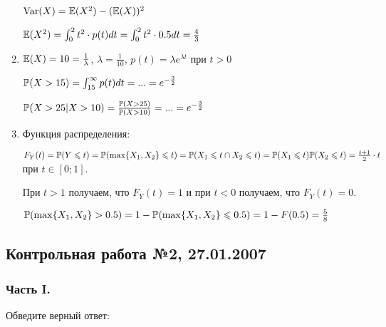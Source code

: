 \begin{enumerate}
$\Var(X)=\E(X^{2})-(\E(X))^{2}$

$\E(X^{2})=\int_{0}^{2}t^{2}\cdot p(t)dt=\int_{0}^{2}t^{2}\cdot 0.5dt=\frac{4}{3}$
\item $\E(X)=10=\frac{1}{\lambda}$, $\lambda=\frac{1}{10}$, $p(t)=\lambda e^{\lambda t}$ при $t>0$

$\P(X>15)=\int_{15}^{\infty}p(t)dt=...=e^{-\frac{3}{2}}$

$\P(X>25|X>10)=\frac{\P(X>25)}{\P(X>10)}=...=e^{-\frac{3}{2}}$
\item Функция распределения:

$F_{Y}(t)=\P(Y\le t)=\P(\max\{X_{1},X_{2}\}\le t)=\P(X_{1}\le t\cap X_{2}\le t)=\P(X_{1}\le t)\P(X_{2}\le t)=\frac{t+1}{2}\cdot t$ при $t\in [0;1]$.

При $t>1$ получаем, что $F_{Y}(t)=1$ и при $t<0$ получаем, что $F_{Y}(t)=0$.

$\P(\max\{X_{1},X_{2}\}>0.5)=1-\P(\max\{X_{1},X_{2}\}\le 0.5)=1-F(0.5)=\frac{5}{8}$
\end{enumerate}

\subsection{Контрольная работа №2, 27.01.2007}

\subsubsection*{Часть I.}

Обведите верный ответ:

